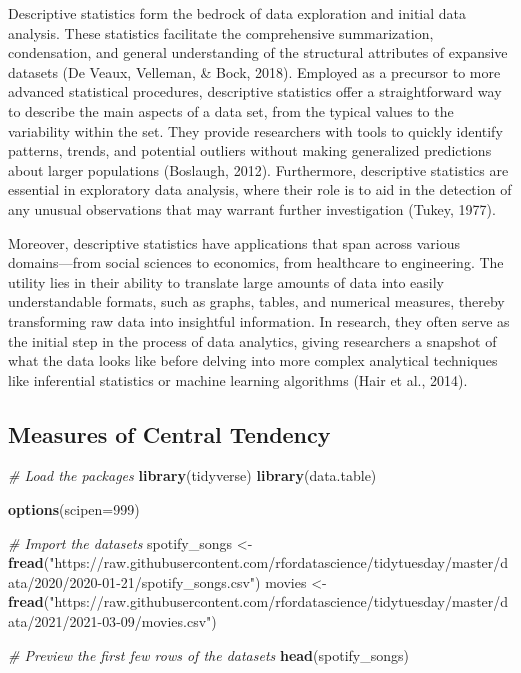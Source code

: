 \documentclass[
  b5paper]{book}
\newenvironment{Shaded}{\begin{snugshade}}{\end{snugshade}}
\newcommand{\AttributeTok}[1]{\textcolor[rgb]{0.13,0.29,0.53}{#1}}
\newcommand{\CommentTok}[1]{\textcolor[rgb]{0.56,0.35,0.01}{\textit{#1}}}
\newcommand{\DecValTok}[1]{\textcolor[rgb]{0.00,0.00,0.81}{#1}}
\newcommand{\FunctionTok}[1]{\textcolor[rgb]{0.13,0.29,0.53}{\textbf{#1}}}
\newcommand{\NormalTok}[1]{#1}
\newcommand{\OtherTok}[1]{\textcolor[rgb]{0.56,0.35,0.01}{#1}}
\newcommand{\StringTok}[1]{\textcolor[rgb]{0.31,0.60,0.02}{#1}}
\begin{document}
Descriptive statistics form the bedrock of data exploration and initial data analysis. These statistics facilitate the comprehensive summarization, condensation, and general understanding of the structural attributes of expansive datasets (De Veaux, Velleman, \& Bock, 2018). Employed as a precursor to more advanced statistical procedures, descriptive statistics offer a straightforward way to describe the main aspects of a data set, from the typical values to the variability within the set. They provide researchers with tools to quickly identify patterns, trends, and potential outliers without making generalized predictions about larger populations (Boslaugh, 2012). Furthermore, descriptive statistics are essential in exploratory data analysis, where their role is to aid in the detection of any unusual observations that may warrant further investigation (Tukey, 1977).

Moreover, descriptive statistics have applications that span across various domains---from social sciences to economics, from healthcare to engineering. The utility lies in their ability to translate large amounts of data into easily understandable formats, such as graphs, tables, and numerical measures, thereby transforming raw data into insightful information. In research, they often serve as the initial step in the process of data analytics, giving researchers a snapshot of what the data looks like before delving into more complex analytical techniques like inferential statistics or machine learning algorithms (Hair et al., 2014).

\hypertarget{measures-of-central-tendency}{%
\subsection*{Measures of Central Tendency}\label{measures-of-central-tendency}}

\begin{Shaded}
\begin{Highlighting}[]
\CommentTok{\# Load the packages}
\FunctionTok{library}\NormalTok{(tidyverse)}
\FunctionTok{library}\NormalTok{(data.table)}

\FunctionTok{options}\NormalTok{(}\AttributeTok{scipen=}\DecValTok{999}\NormalTok{)}

\CommentTok{\# Import the datasets}
\NormalTok{spotify\_songs }\OtherTok{\textless{}{-}} \FunctionTok{fread}\NormalTok{(}\StringTok{"https://raw.githubusercontent.com/rfordatascience/tidytuesday/master/data/2020/2020{-}01{-}21/spotify\_songs.csv"}\NormalTok{)}
\NormalTok{movies }\OtherTok{\textless{}{-}} \FunctionTok{fread}\NormalTok{(}\StringTok{"https://raw.githubusercontent.com/rfordatascience/tidytuesday/master/data/2021/2021{-}03{-}09/movies.csv"}\NormalTok{)}

\CommentTok{\# Preview the first few rows of the datasets}
\FunctionTok{head}\NormalTok{(spotify\_songs)}
\end{Highlighting}
\end{Shaded}
\end{document}

